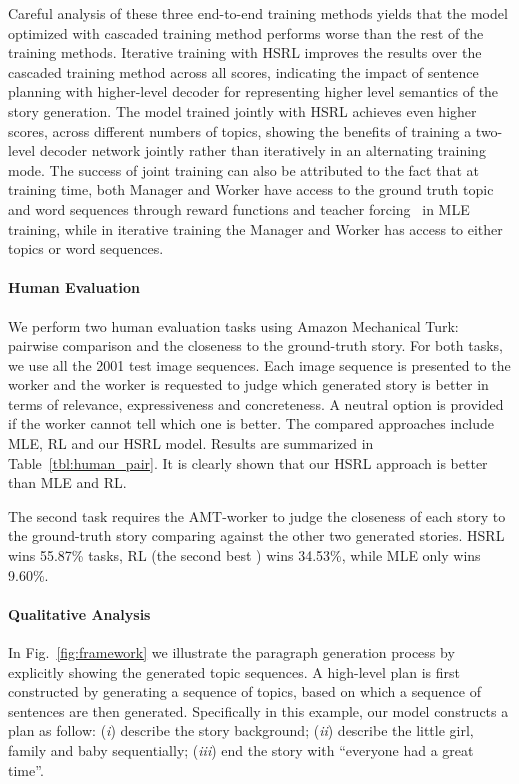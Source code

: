 \documentclass[letterpaper]{article} \usepackage{aaai19}  \usepackage{times}  \usepackage{helvet}  \usepackage{courier}  \usepackage{url}  \usepackage{graphicx}
\begin{document}
Careful analysis of these three end-to-end training methods yields that the model optimized with cascaded training method performs worse than the rest of the training methods. Iterative training with HSRL improves the results over the cascaded training method across all scores,  
indicating the impact of sentence planning with higher-level decoder for representing higher level semantics of the story generation. The model trained jointly with HSRL achieves even higher scores, across different numbers of topics, showing the benefits of training a two-level decoder network jointly rather than iteratively in an alternating training mode. The success of joint training can also be attributed to the fact that at training time, both Manager and Worker have access to the ground truth topic and word sequences through reward functions and teacher forcing~\cite{lamb2016professor} in MLE training, while in iterative training the Manager and Worker has access to either topics or word sequences. 

\paragraph{Human Evaluation}
We perform two human evaluation tasks using Amazon Mechanical Turk: pairwise comparison and the closeness to the ground-truth story.  
For both tasks, we use all the 2001 test image sequences. Each image sequence is presented to the worker and the worker is requested to judge which generated story is better in terms of relevance, expressiveness and concreteness. A neutral option is provided if the worker cannot tell which one is better. The compared approaches include MLE, RL and our HSRL model. Results are summarized in Table~\ref{tbl:human_pair}. It is clearly shown that our HSRL approach is better than MLE and RL. 

The second task requires the AMT-worker to judge the closeness of each story to the ground-truth story comparing against the other two generated stories.  
HSRL wins 55.87\% tasks, RL (the second best ) wins 34.53\%, while MLE only wins 9.60\%. 

\paragraph{Qualitative Analysis} In Fig.~\ref{fig:framework} we illustrate the paragraph generation process by explicitly showing the generated topic sequences. A high-level plan is first constructed by generating a sequence of topics, based on which a sequence of sentences are then generated. Specifically in this example, our model constructs a plan as follow: (\emph{i}) describe the story background; (\emph{ii}) describe the little girl, family and baby sequentially; (\emph{iii}) end the story with ``everyone had a great time''.
\end{document}
